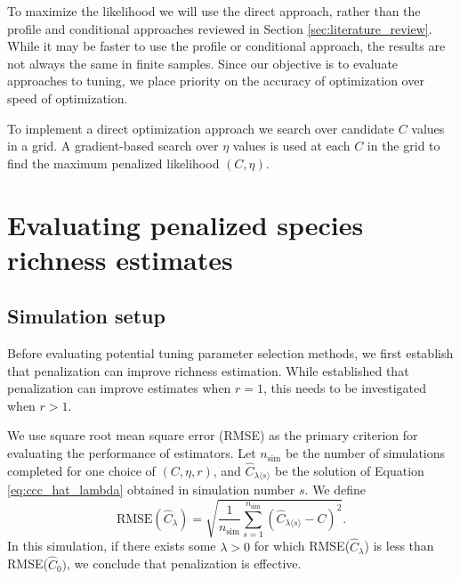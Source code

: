 \documentclass[12pt]{article}
\theoremstyle{break}
\theoremstyle{break}
\begin{document}
To maximize the likelihood we will use the direct approach, rather than the profile and conditional approaches reviewed in Section \ref{sec:literature_review}.  While it may be faster to use the profile or conditional approach, the results are not always the same in finite samples.
Since our objective is to evaluate approaches to tuning, we place priority on the accuracy of optimization over speed of optimization.

To implement a direct optimization approach we search over candidate $C$ values in a grid.  A gradient-based search over $\eta$ values is used at each $C$ in the grid to find the maximum penalized likelihood  $(C, \eta)$.

\section{Evaluating penalized species richness estimates}
\label{sec:efficacy_sims}
\subsection{Simulation setup}

Before evaluating potential tuning parameter selection methods, we first establish that penalization can improve richness estimation. While \citet{wang_2005} established that penalization can improve estimates when $r = 1$, this needs to be investigated when $r> 1$.

We use square root mean square error (RMSE) as the primary criterion for evaluating the performance of estimators.  Let $n_{\text{sim}}$ be the number of simulations completed for one choice of $(C, \eta, r)$, and $\widehat{C}_{\lambda \langle s \rangle}$ be the solution of Equation \eqref{eq:ccc_hat_lambda} obtained in simulation number $s$.  We define
\begin{equation}
 \text{RMSE}\left( \widehat{C}_{\lambda} \right) = \sqrt{ \frac{1}{n_{\text{sim}}} \sum_{s=1}^{n_{\text{sim}}} \left( \widehat{C}_{\lambda \langle s \rangle} - C\right)^2 }.
\end{equation}
In this simulation, if there exists some $\lambda > 0$ for which RMSE($\widehat{C}_{\lambda}$) is less than RMSE($\widehat{C}_0)$, we conclude that penalization is effective.
\end{document}
